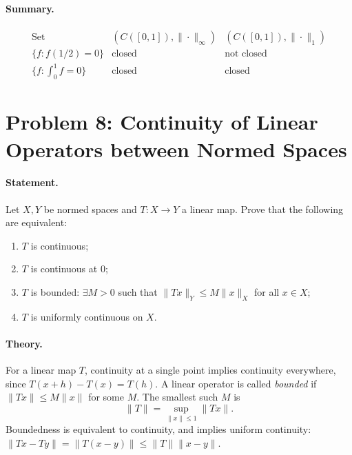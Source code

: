 \documentclass[12pt,a4paper]{article}
\theoremstyle{plain}
\theoremstyle{definition}
\theoremstyle{remark}
\theoremstyle{remark}
\begin{document}
\paragraph{Summary.}
\[
\begin{array}{c|c|c}
	\text{Set} & (C([0,1]),\|\cdot\|_\infty) & (C([0,1]),\|\cdot\|_1)\\ \hline
	\{f: f(1/2)=0\} & \text{closed} & \text{not closed}\\
	\{f: \int_0^1 f=0\} & \text{closed} & \text{closed}
\end{array}
\]

\section*{Problem 8: Continuity of Linear Operators between Normed Spaces}

\paragraph{Statement.}
Let $X,Y$ be normed spaces and $T:X\to Y$ a linear map. Prove that the following are equivalent:
\begin{enumerate}
	\item $T$ is continuous;
	\item $T$ is continuous at $0$;
	\item $T$ is bounded: $\exists M>0$ such that $\|Tx\|_Y\le M\|x\|_X$ for all $x\in X$;
	\item $T$ is uniformly continuous on $X$.
\end{enumerate}

\paragraph{Theory.}
For a linear map $T$, continuity at a single point implies continuity everywhere, since
$T(x+h)-T(x)=T(h)$. A linear operator is called \emph{bounded} if
$\|Tx\|\le M\|x\|$ for some $M$. The smallest such $M$ is
\[
\|T\|=\sup_{\|x\|\le 1}\|Tx\|.
\]
Boundedness is equivalent to continuity, and implies uniform continuity:
\(\|Tx-Ty\|=\|T(x-y)\|\le\|T\|\|x-y\|\).
\end{document}
